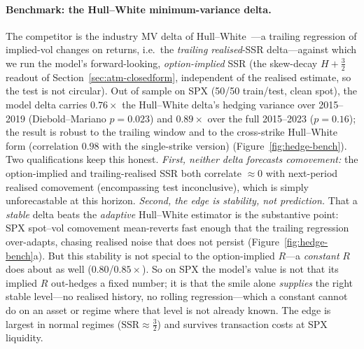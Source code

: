 \documentclass[11pt]{article}
\newcommand{\SSR}{\mathrm{SSR}}
\begin{document}
\paragraph{Benchmark: the Hull--White minimum-variance delta.}
The competitor is the industry MV delta of Hull--White~\cite{hullwhite2017}---a trailing regression
of implied-vol changes on returns, i.e.\ the \emph{trailing realised}-SSR delta---against which we run
the model's forward-looking, \emph{option-implied} SSR (the skew-decay $H{+}\tfrac32$ readout of
Section~\ref{sec:atm-closedform}, independent of the realised estimate, so the test is not circular).
Out of sample on SPX (50/50 train/test, clean spot), the model delta carries $\mathbf{0.76}\times$ the
Hull--White delta's hedging variance over 2015--2019 (Diebold--Mariano $p{=}0.023$) and $0.89\times$
over the full 2015--2023 ($p{=}0.16$); the result is robust to the trailing window and to the
cross-strike Hull--White form (correlation $0.98$ with the single-strike version)
(Figure~\ref{fig:hedge-bench}). Two qualifications keep this honest. \emph{First, neither delta
forecasts comovement:} the option-implied and trailing-realised SSR both correlate ${\approx}0$ with
next-period realised comovement (encompassing test inconclusive), which is simply unforecastable at
this horizon. \emph{Second, the edge is stability, not prediction.} That a \emph{stable} delta beats
the \emph{adaptive} Hull--White estimator is the substantive point: SPX spot--vol comovement
mean-reverts fast enough that the trailing regression over-adapts, chasing realised noise that does
not persist (Figure~\ref{fig:hedge-bench}a). But this stability is not special to the option-implied
$R$---a \emph{constant} $R$ does about as well ($0.80$/$0.85\times$). So on SPX the model's value is
not that its implied $R$ out-hedges a fixed number; it is that the smile alone \emph{supplies} the
right stable level---no realised history, no rolling regression---which a constant cannot do on an
asset or regime where that level is not already known. The edge is largest in normal regimes
($\SSR\approx\tfrac32$) and survives transaction costs at SPX liquidity.
\end{document}
